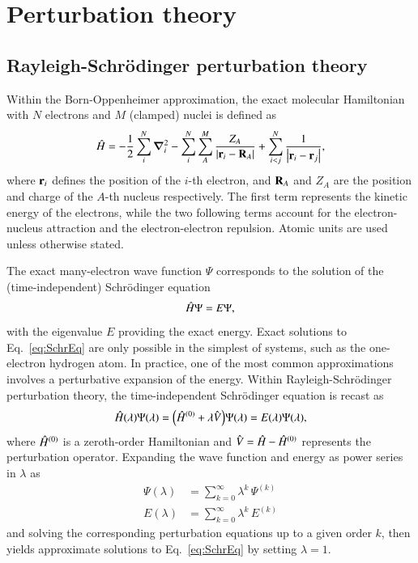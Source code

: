 \documentclass[aps,prb,reprint,noshowkeys,superscriptaddress]{revtex4-1}
\newcommand{\Ne}{N} %
\newcommand{\Nn}{M} %
\newcommand{\hH}{\Hat{H}}
\newcommand{\hV}{\Hat{V}}
\begin{document}
\section{Perturbation theory}

\subsection{Rayleigh-Schr\"odinger perturbation theory}

Within the Born-Oppenheimer approximation, the exact molecular Hamiltonian with $\Ne$ electrons and 
$\Nn$ (clamped) nuclei is defined as
\begin{equation}\label{eq:ExactHamiltonian}
    \hH = 
    - \frac{1}{2} \sum_{i}^{\Ne} \grad_i^2 
    - \sum_{i}^{\Ne} \sum_{A}^{\Nn} \frac{Z_A}{\abs{\vb{r}_i-\vb{R}_A}} 
    + \sum_{i<j}^{\Ne}\frac{1}{\abs{\vb{r}_i-\vb{r}_j}},
\end{equation}
where $\vb{r}_i$ defines the position of the $i$-th electron, and $\vb{R}_{A}$ and $Z_{A}$ are the position
and charge of the $A$-th nucleus respectively.
The first term represents the kinetic energy of the electrons, while 
the two following terms account for the electron-nucleus attraction and the electron-electron repulsion.
Atomic units are used unless otherwise stated.

The exact many-electron wave function $\Psi$ corresponds to the solution of the (time-independent)
Schr\"{o}dinger equation
\begin{equation} 
	\hH\Psi = E \Psi,
    \label{eq:SchrEq}
\end{equation} 
with the eigenvalue $E$ providing the exact energy.
Exact solutions to Eq.~\eqref{eq:SchrEq} are only possible in the simplest of systems, such as 
the one-electron hydrogen atom. 
In practice, one of the most common approximations involves
a perturbative expansion of the energy.
Within Rayleigh-Schr\"odinger perturbation theory, the time-independent Schr\"odinger equation 
is recast as 
\begin{equation} 
	\hH(\lambda) \Psi(\lambda) 
    = \qty(\hH^{(0)} + \lambda \hV ) \Psi(\lambda) 
    = E(\lambda) \Psi(\lambda),
    \label{eq:SchrEq-PT}
\end{equation}
where $\hH^{(0)}$ is a zeroth-order Hamiltonian and $\hV = \hH - \hH^{(0)}$ represents the perturbation operator.
Expanding the wave function and energy as power series in $\lambda$ as 
\begin{subequations}
\begin{align}
    \Psi(\lambda) &= \sum_{k=0}^{\infty} \lambda^{k}\,\Psi^{(k)} 
    \label{eq:psi_expansion}
    \\
    E(\lambda) &= \sum_{k=0}^{\infty} \lambda^{k}\,E^{(k)}
    \label{eq:E_expansion}
\end{align}
\end{subequations}
and solving the corresponding perturbation equations up to a given order $k$, then 
yields approximate solutions to Eq.~\eqref{eq:SchrEq} by setting $\lambda = 1$.
\end{document}
